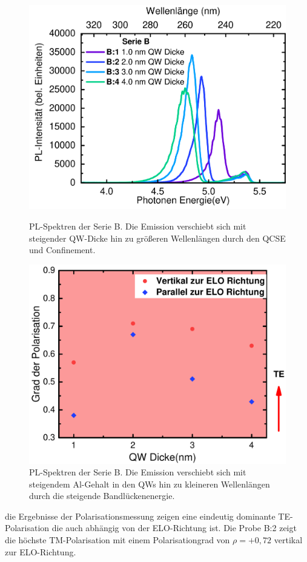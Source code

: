 \begin{figure}[htb]
  \centering
  \begin{minipage}[t]{0.49\textwidth}
    \centering
    \includegraphics[width=\textwidth]{Bilder/spektrenQWvariation.pdf}
    \caption{PL-Spektren der Serie B. Die Emission verschiebt sich mit steigender QW-Dicke hin zu gr\"oßeren Wellenl\"angen durch den QCSE und Confinement.  }
    \label{fig:qwvariationSpektrum}
  \end{minipage}
	\hfill
  \begin{minipage}[t]{0.49\textwidth}
    \centering
    \includegraphics[width=\linewidth]{Bilder/polarisationDickenvariation.pdf}
    \caption{PL-Spektren der Serie B. Die Emission verschiebt sich mit steigendem Al-Gehalt in den QWs hin zu kleineren Wellenl\"angen durch die steigende Bandl\"uckenenergie. }
    \label{fig:qwvariationPolarisation}
  \end{minipage}
\end{figure}
%
die Ergebnisse der Polarisationsmessung zeigen eine eindeutig dominante TE-Polarisation die auch abh\"angig von der ELO-Richtung ist. Die Probe B:2 zeigt die h\"ochste TM-Polarisation mit einem Polarisationgrad von $\rho=+0,72$ vertikal zur ELO-Richtung. 